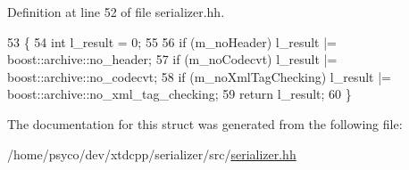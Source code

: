 Definition at line 52 of file serializer.\+hh.


\begin{DoxyCode}
53   \{
54     \textcolor{keywordtype}{int} l\_result = 0;
55 
56     \textcolor{keywordflow}{if} (m\_noHeader)         l\_result |= boost::archive::no\_header;
57     \textcolor{keywordflow}{if} (m\_noCodecvt)        l\_result |= boost::archive::no\_codecvt;
58     \textcolor{keywordflow}{if} (m\_noXmlTagChecking) l\_result |= boost::archive::no\_xml\_tag\_checking;
59     \textcolor{keywordflow}{return} l\_result;
60   \}
\end{DoxyCode}


The documentation for this struct was generated from the following file\+:\begin{DoxyCompactItemize}
\item 
/home/psyco/dev/xtdcpp/serializer/src/\hyperlink{serializer_8hh}{serializer.\+hh}\end{DoxyCompactItemize}
